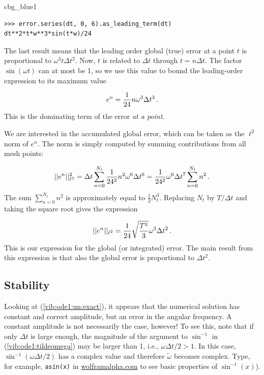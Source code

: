 \documentclass[%
oneside,                 %
final,                   %
10pt]{article}
\newenvironment{_cod_tight}[1]{
   \def\FrameCommand{\colorbox{#1}}
   \FrameRule0.6pt\MakeFramed {\FrameRestore}\vskip3mm}
   {\vskip0mm\endMakeFramed}
\newenvironment{cod}[1]{
\bgroup\rmfamily
\fboxsep=0mm\relax
\begin{_cod_tight}{#1}
\list{}{\parsep=-2mm\parskip=0mm\topsep=0pt\leftmargin=2mm
\rightmargin=2\leftmargin\leftmargin=4pt\relax}
\item\relax}
{\endlist\end{_cod_tight}\egroup}
\begin{document}
\begin{cod}{cbg_blue1}\begin{Verbatim}[numbers=none,fontsize=\fontsize{9pt}{9pt},baselinestretch=0.95,xleftmargin=2mm]
>>> error.series(dt, 0, 6).as_leading_term(dt)
dt**2*t*w**3*sin(t*w)/24
\end{Verbatim}
\end{cod}
\noindent

The last result
means that the leading order global (true) error at a point $t$
is proportional to $\omega^3t\Delta t^2$. Now, $t$ is related
to $\Delta t$ through $t=n\Delta t$. The factor
$\sin(\omega t)$ can at most be 1, so we use this value to
bound the leading-order expression to its maximum value

\[ e^n = \frac{1}{24}n\omega^3\Delta t^3\tp\]
This is the dominating term of the error \emph{at a point}.

We are interested in the accumulated global error, which can
be taken as the $\ell^2$ norm of $e^n$.
The norm is simply computed by summing contributions from all mesh
points:

\[ ||e^n||_{\ell^2}^2 = \Delta t\sum_{n=0}^{N_t} \frac{1}{24^2}n^2\omega^6\Delta t^6
=\frac{1}{24^2}\omega^6\Delta t^7 \sum_{n=0}^{N_t} n^2\tp\]
The sum $\sum_{n=0}^{N_t} n^2$ is approximately equal to
$\frac{1}{3}N_t^3$. Replacing $N_t$ by $T/\Delta t$ and taking
the square root gives the expression

\[ ||e^n||_{\ell^2} = \frac{1}{24}\sqrt{\frac{T^3}{3}}\omega^3\Delta t^2\tp\]
This is our expression for the global (or integrated) error.
The main result from this expression is that also the global error
is proportional to $\Delta t^2$.



\subsection{Stability}

Looking at (\ref{vib:ode1:un:exact}), it appears that the numerical
solution has constant and correct amplitude, but an error in the
angular frequency. A constant amplitude is not necessarily the case,
however! To see this, note that if only $\Delta t$ is large
enough, the magnitude of the argument to $\sin^{-1}$ in
(\ref{vib:ode1:tildeomega}) may be larger than 1, i.e.,
$\omega\Delta t/2 > 1$. In this case, $\sin^{-1}(\omega\Delta t/2)$
has a complex value and therefore $\tilde\omega$ becomes complex.
Type, for example, \texttt{asin(x)} in
\href{{http://www.wolframalpha.com}}{wolframalpha.com} to see basic properties of $\sin^{-1} (x)$).
\end{document}
